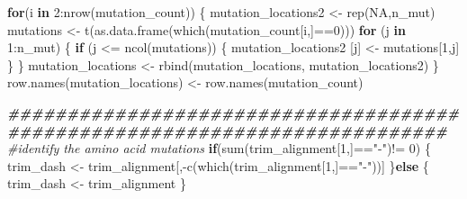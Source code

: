 \documentclass[
]{article}
\newenvironment{Shaded}{\begin{snugshade}}{\end{snugshade}}
\newcommand{\CommentTok}[1]{\textcolor[rgb]{0.56,0.35,0.01}{\textit{#1}}}
\newcommand{\ConstantTok}[1]{\textcolor[rgb]{0.00,0.00,0.00}{#1}}
\newcommand{\ControlFlowTok}[1]{\textcolor[rgb]{0.13,0.29,0.53}{\textbf{#1}}}
\newcommand{\DecValTok}[1]{\textcolor[rgb]{0.00,0.00,0.81}{#1}}
\newcommand{\DocumentationTok}[1]{\textcolor[rgb]{0.56,0.35,0.01}{\textbf{\textit{#1}}}}
\newcommand{\FunctionTok}[1]{\textcolor[rgb]{0.00,0.00,0.00}{#1}}
\newcommand{\NormalTok}[1]{#1}
\newcommand{\OtherTok}[1]{\textcolor[rgb]{0.56,0.35,0.01}{#1}}
\newcommand{\SpecialCharTok}[1]{\textcolor[rgb]{0.00,0.00,0.00}{#1}}
\newcommand{\StringTok}[1]{\textcolor[rgb]{0.31,0.60,0.02}{#1}}
\begin{document}
\begin{Shaded}
\begin{Highlighting}[]
\ControlFlowTok{for}\NormalTok{(i }\ControlFlowTok{in} \DecValTok{2}\SpecialCharTok{:}\FunctionTok{nrow}\NormalTok{(mutation\_count))}
\NormalTok{\{}
\NormalTok{  mutation\_locations2 }\OtherTok{\textless{}{-}} \FunctionTok{rep}\NormalTok{(}\ConstantTok{NA}\NormalTok{,n\_mut)}
\NormalTok{  mutations }\OtherTok{\textless{}{-}} \FunctionTok{t}\NormalTok{(}\FunctionTok{as.data.frame}\NormalTok{(}\FunctionTok{which}\NormalTok{(mutation\_count[i,]}\SpecialCharTok{==}\DecValTok{0}\NormalTok{)))}
  \ControlFlowTok{for}\NormalTok{ (j }\ControlFlowTok{in} \DecValTok{1}\SpecialCharTok{:}\NormalTok{n\_mut)}
\NormalTok{  \{}
    \ControlFlowTok{if}\NormalTok{ (j }\SpecialCharTok{\textless{}=} \FunctionTok{ncol}\NormalTok{(mutations))}
\NormalTok{    \{}
\NormalTok{      mutation\_locations2 [j] }\OtherTok{\textless{}{-}}\NormalTok{ mutations[}\DecValTok{1}\NormalTok{,j]}
\NormalTok{    \}}
\NormalTok{  \}}
\NormalTok{  mutation\_locations }\OtherTok{\textless{}{-}}  \FunctionTok{rbind}\NormalTok{(mutation\_locations, mutation\_locations2)}
\NormalTok{\}}
\FunctionTok{row.names}\NormalTok{(mutation\_locations) }\OtherTok{\textless{}{-}} \FunctionTok{row.names}\NormalTok{(mutation\_count)}

\DocumentationTok{\#\#\#\#\#\#\#\#\#\#\#\#\#\#\#\#\#\#\#\#\#\#\#\#\#\#\#\#\#\#\#\#\#\#\#\#\#\#\#\#\#\#\#\#\#\#\#\#\#\#\#\#\#\#\#\#\#\#\#\#\#\#\#\#\#\#\#\#\#\#\#\#\#\#\#}
\CommentTok{\#identify the amino acid mutations}
\ControlFlowTok{if}\NormalTok{(}\FunctionTok{sum}\NormalTok{(trim\_alignment[}\DecValTok{1}\NormalTok{,]}\SpecialCharTok{==}\StringTok{"{-}"}\NormalTok{)}\SpecialCharTok{!=} \DecValTok{0}\NormalTok{)}
\NormalTok{\{}
\NormalTok{  trim\_dash }\OtherTok{\textless{}{-}}\NormalTok{ trim\_alignment[,}\SpecialCharTok{{-}}\FunctionTok{c}\NormalTok{(}\FunctionTok{which}\NormalTok{(trim\_alignment[}\DecValTok{1}\NormalTok{,]}\SpecialCharTok{==}\StringTok{"{-}"}\NormalTok{))] }
\NormalTok{\}}\ControlFlowTok{else}
\NormalTok{\{}
\NormalTok{  trim\_dash }\OtherTok{\textless{}{-}}\NormalTok{ trim\_alignment}
\NormalTok{\}}


\end{Highlighting}
\end{Shaded}
\end{document}
